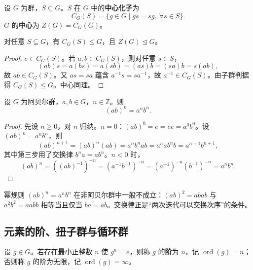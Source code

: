\begin{definition}[中心化子]\label{def:centraliser}
设 $G$ 为群，$S\subseteq G$。$S$ 在 $G$ 中的\textbf{中心化子}为
\[
C_G(S)=\{g\in G\mid gs=sg,\ \forall s\in S\}.
\]
$G$ 的\textbf{中心}为 $Z(G)=C_G(G)$。
\end{definition}

\begin{proposition}[中心化子是子群]\label{prop:centraliser_subgroup}
对任意 $S\subseteq G$，有 $C_G(S)\le G$，且 $Z(G)\trianglelefteq G$。
\end{proposition}

\begin{proof}
$e\in C_G(S)$。若 $a,b\in C_G(S)$，则对任意 $s\in S$，
\[
(ab)s=a(bs)=a(sb)=(as)b=(sa)b=s(ab),
\]
故 $ab\in C_G(S)$。又 $as=sa$ 蕴含 $a^{-1}s=sa^{-1}$，故 $a^{-1}\in C_G(S)$。由子群判据得 $C_G(S)\le G$。中心同理。
\end{proof}

\begin{property}[阿贝尔群的幂规则]\label{prop:abelian_power}
设 $G$ 为阿贝尔群，$a,b\in G$，$n\in\mathbb{Z}$。则
\[
(ab)^n=a^n b^n.
\]
\end{property}

\begin{proof}
先设 $n\ge 0$，对 $n$ 归纳。$n=0$：$(ab)^0=e=ee=a^0b^0$。设 $(ab)^n=a^n b^n$，则
\[
(ab)^{n+1}=(ab)^n(ab)=a^n b^n a b=a^n a b^n b=a^{n+1}b^{n+1},
\]
其中第三步用了交换律 $b^n a=a b^n$。$n<0$ 时，
\[
(ab)^n=((ab)^{-1})^{-n}=(a^{-1}b^{-1})^{-n}=(a^{-1})^{-n}(b^{-1})^{-n}=a^n b^n.
\]
\end{proof}

\begin{remark}[交换律的必要性]\label{rem:abelian_power_necessary}
幂规则 $(ab)^n=a^n b^n$ 在非阿贝尔群中一般不成立：$(ab)^2=abab$ 与 $a^2b^2=aabb$ 相等当且仅当 $ba=ab$。交换律正是“两次迭代可以交换次序”的条件。
\end{remark}

\subsection{元素的阶、扭子群与循环群}

\begin{definition}[元素的阶]\label{def:element_order}
设 $g\in G$。若存在最小正整数 $n$ 使 $g^n=e$，则称 $g$ 的\textbf{阶}为 $n$，记 $\operatorname{ord}(g)=n$；否则称 $g$ 的阶为无限，记 $\operatorname{ord}(g)=\infty$。
\end{definition}

